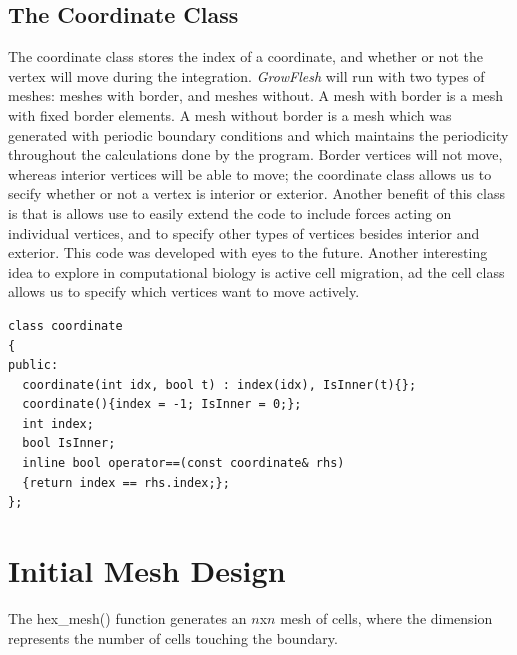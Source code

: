 \subsection{The Coordinate Class}
The coordinate class stores the index of a coordinate, and whether or not the vertex will move during the integration. \emph{GrowFlesh} will run with two types of meshes: meshes with border, and meshes without. A mesh with border is a mesh with fixed border elements. A mesh without border is a mesh which was generated with periodic boundary conditions and which maintains the periodicity throughout the calculations done by the program. Border vertices will not move, whereas interior vertices will be able to move; the coordinate class allows us to secify whether or not a vertex is interior or exterior. Another benefit of this class is that is allows use to easily extend the code to include forces acting on individual vertices, and to specify other types of vertices besides interior and exterior. This code was developed with eyes to the future. Another interesting idea to explore in computational biology is active cell migration, ad the cell class allows us to specify which vertices want to move actively.
\begin{lstlisting}
class coordinate
{
public:
  coordinate(int idx, bool t) : index(idx), IsInner(t){};
  coordinate(){index = -1; IsInner = 0;};
  int index;
  bool IsInner;
  inline bool operator==(const coordinate& rhs)
  {return index == rhs.index;};
};
\end{lstlisting}

\section{Initial Mesh Design}
The hex\_mesh() function generates an $n$x$n$ mesh of cells, where the dimension represents the number of cells touching the boundary. 

